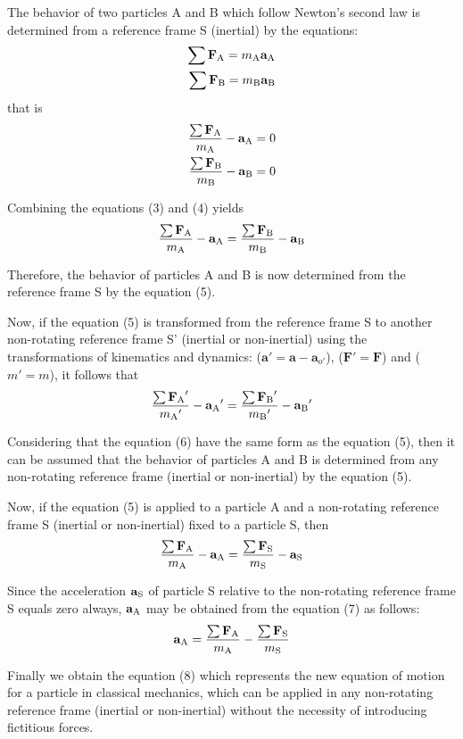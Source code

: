 \documentclass[12pt]{article}
\newcommand{\rt}{'}
\newcommand{\mm}{m}
\newcommand{\rot}{_{o'}}
\newcommand{\vA}{\mathbf{a}}
\newcommand{\vF}{\mathbf{F}}
\newcommand{\ra}{_{\mbox {\scriptsize A}}}
\newcommand{\rb}{_{\mbox {\scriptsize B}}}
\newcommand{\rs}{_{\mbox {\scriptsize S}}}
\begin{document}
\par The behavior of two particles A and B which follow Newton's second law is determined from a reference frame S (inertial) by the equations:
\begin{eqnarray}
\sum \vF\ra = \mm\ra\vA\ra \\
\sum \vF\rb = \mm\rb\vA\rb
\end{eqnarray}
\noindent that is
\begin{eqnarray}
\frac{\sum \vF\ra}{\mm\ra} - \vA\ra = 0 \\
\frac{\sum \vF\rb}{\mm\rb} - \vA\rb = 0
\end{eqnarray}
\par Combining the equations (3) and (4) yields
\begin{eqnarray}
\frac{\sum \vF\ra}{\mm\ra} - \vA\ra = \frac{\sum \vF\rb}{\mm\rb} - \vA\rb
\end{eqnarray}
\par Therefore, the behavior of particles A and B is now determined from the reference frame S by the equation (5).
\par Now, if the equation (5) is transformed from the reference frame S to another non-rotating reference frame S' (inertial or non-inertial) using the transformations of kinematics and \hbox {dynamics:} ($\vA\rt = \vA - \vA\rot$), ($\vF\rt = \vF$) and ($\mm\rt = \mm$), it follows that
\begin{eqnarray}
\frac{\sum {\vF\ra}\rt}{{\mm\ra}\rt} - {\vA\ra}\rt = \frac{\sum {\vF\rb}\rt}{{\mm\rb}\rt} - {\vA\rb}\rt
\end{eqnarray}
\par Considering that the equation (6) have the same form as the equation (5), then it can be assumed that the behavior of particles A and B is determined from any non-rotating reference frame (inertial or non-inertial) by the equation (5).
\par Now, if the equation (5) is applied to a particle A and a non-rotating reference frame S (inertial or non-inertial) fixed to a particle S, then
\begin{eqnarray}
\frac{\sum \vF\ra}{\mm\ra} - \vA\ra = \frac{\sum \vF\rs}{\mm\rs} - \vA\rs
\end{eqnarray}
\par Since the acceleration $\vA\rs$ of particle S relative to the non-rotating reference frame S equals zero always, $\vA\ra$ may be obtained from the equation (7) as follows:
\begin{eqnarray}
\vA\ra = \frac{\sum \vF\ra}{\mm\ra} - \frac{\sum \vF\rs}{\mm\rs}
\end{eqnarray}
\par Finally we obtain the equation (8) which represents the new equation of motion for a particle in classical mechanics, which can be applied in any non-rotating reference frame (inertial or non-inertial) without the necessity of introducing fictitious forces.
\end{document}
